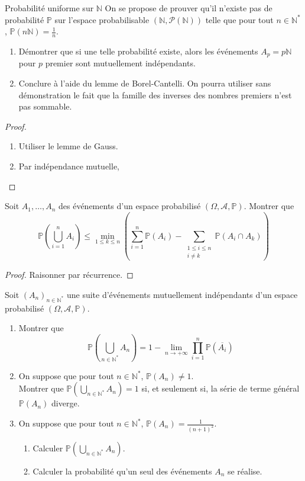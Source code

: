 \documentclass[french,a4paper]{article}
\renewcommand{\P}{\mathbb{P}}
\newcommand{\N}{\mathbb{N}}
\newcommand{\st}{^*}
\theoremstyle{plain}
\theoremstyle{definition}
\theoremstyle{remark}
\begin{document}
\begin{ex}[Châteaux]{Probabilité uniforme sur $\N$}
	On se propose de prouver qu'il n'existe pas de probabilité $\P$ sur l'espace probabilisable $(\N,\mathcal{P}(\N))$ telle que pour tout $n\in\N\st$, $\P(n\N)=\displaystyle\frac{1}{n}$.
	\begin{enumerate}
		\item Démontrer que si une telle probabilité existe, alors les événements $A_p=p\N$ pour $p$ premier sont mutuellement indépendants.
		\item Conclure à l'aide du lemme de Borel-Cantelli. On pourra utiliser sans démonstration le fait que la famille des inverses des nombres premiers n'est pas sommable.
	\end{enumerate}
\end{ex}
\begin{proof}
	\begin{enumerate}
		\item Utiliser le lemme de Gauss.
		\item Par indépendance mutuelle,
	\end{enumerate}
\end{proof}

\begin{ex}[Moulin.29]{}
	Soit $A_1,\ldots, A_n$ des événements d'un espace probabilisé $(\Omega,\mathcal{A},\P)$. Montrer que $$\P\left(\bigcup_{i=1}^nA_i\right)\leqslant\underset{1\leqslant k\leqslant n}{\min}\left(\sum_{i=1}^{n}\P(A_i)-\sum_{\substack{1\leqslant i\leqslant n \\ i\ne k}}\P(A_i\cap A_k)\right)$$
\end{ex}
\begin{proof}
	Raisonner par récurrence.
\end{proof}

\begin{ex}[Moulin.30]{}
	Soit $(A_n)_{n\in\N\st}$ une suite d'événements mutuellement indépendants d'un espace probabilisé $(\Omega,\mathcal{A},\P)$.
	\begin{enumerate}
		\item Montrer que $$\P\left(\bigcup_{n\in\N\st}A_n\right)=1-\underset{n\to+\infty}{\lim}\prod_{i=1}^{n}\P(\overline{A_i})$$
		\item On suppose que pour tout $n\in\N\st$, $\P(A_n)\ne 1$. \\ Montrer que $\displaystyle\P\left(\bigcup_{n\in\N\st}A_n\right)=1$ si, et seulement si, la série de terme général $\P(A_n)$ diverge.
		\item On suppose que pour tout $n\in\N\st$, $\P(A_n)=\displaystyle\frac{1}{(n+1)^2}$.
		\begin{enumerate}[label=\alph*.]
			\item Calculer $\displaystyle\P\left(\bigcup_{n\in\N\st}A_n\right)$.
			\item Calculer la probabilité qu'un seul des événements $A_n$ se réalise.
		\end{enumerate}
	\end{enumerate}
\end{ex}
\end{document}
